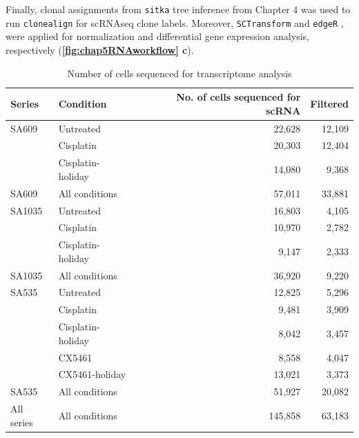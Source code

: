 Finally, clonal assignments from \texttt{sitka} tree inference from Chapter 4 was used to run \texttt{clonealign} \cite{campbell2019clonealign} for \ac{scRNAseq} clone labels. Moreover, \texttt{SCTransform} \cite{hafemeister2019normalization} and \texttt{edgeR} \cite{robinson2010edger}, were applied for normalization and differential gene expression analysis, respectively (\textbf{\autoref{fig:chap5RNAworkflow} c}). 


\begin{table}[htbp]
 \centering
  \caption{Number of cells sequenced for transcriptome analysis}
{
\begin{tabular}{|l|l|r|r|}
\hline
Series & Condition     & No. of cells sequenced for scRNA & Filtered \\
\hline
\hline
SA609 & Untreated & 22,628 & 12,109 \\
 & Cisplatin & 20,303 & 12,404 \\
 & Cisplatin-holiday & 14,080 & 9,368 \\
 \hline
SA609 & All conditions & 57,011 & 33,881 \\
 \hline
 \hline
SA1035 & Untreated & 16,803 & 4,105 \\
 & Cisplatin & 10,970 & 2,782 \\
& Cisplatin-holiday & 9,147 & 2,333 \\ 
\hline
SA1035 & All conditions & 36,920  & 9,220 \\
\hline
\hline
SA535 & Untreated & 12,825 & 5,296\\
 & Cisplatin & 9,481 & 3,909\\
 & Cisplatin-holiday & 8,042 & 3,457\\
 & CX5461 & 8,558 & 4,047\\
 & CX5461-holiday & 13,021 & 3,373\\
 \hline
SA535 & All conditions & 51,927 & 20,082 \\
\hline
\hline

\hline
All series & All conditions          & 145,858                          & 63,183\\
\hline
\end{tabular}%
\label{tab:nofcellsRNA}
}
\end{table}

